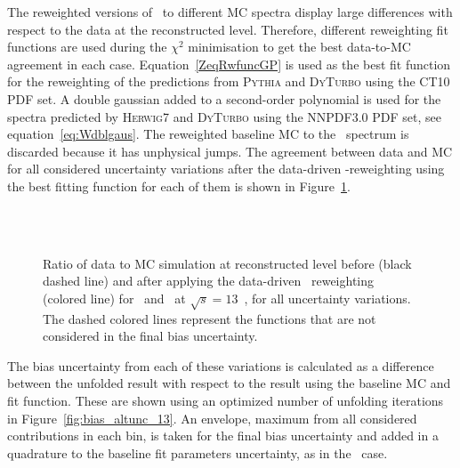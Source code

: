 The reweighted versions of \POWHEG\ to different MC spectra display large differences with respect to the data at the reconstructed level. Therefore, different reweighting fit functions are used during the $\chi^{2}$ minimisation to get the best data-to-MC agreement in each case.
Equation~\ref{ZeqRwfuncGP} is used as the best fit function for the reweighting of the predictions from \textsc{Pythia} and \textsc{DyTurbo} using the CT10 PDF set. A double gaussian added to a second-order polynomial is used for the spectra predicted by \textsc{Herwig7} and \textsc{DyTurbo} using the NNPDF3.0 PDF set, see equation~\ref{eq:Wdblgaus}.
The reweighted baseline MC to the \Sherpa\ spectrum is discarded because it has unphysical jumps.
The agreement between data and MC for all considered uncertainty variations after the data-driven \pt-reweighting using the best fitting function for each of them is shown in Figure~\ref{fig:fit_datamc_altunc_13_1GeV}.

\begin{figure}[h]
\centering
{}
\\
\\
\caption{Ratio of data to MC simulation at reconstructed level before (black dashed line) and after applying the data-driven \pt\ reweighting (colored line) for \ptll\ and \ut\ at $\sqrt{s} = 13$~\TeV, for all uncertainty variations. The dashed colored lines represent the functions that are not considered in the final bias uncertainty. }
\label{fig:fit_datamc_altunc_13_1GeV}
\end{figure}

The bias uncertainty from each of these variations is calculated as a difference between the unfolded result with respect to the result using the baseline MC and fit function.
These are shown using an optimized number of unfolding iterations in Figure~\ref{fig:bias_altunc_13}.
An envelope, maximum from all considered contributions in each bin, is taken for the final bias uncertainty and added in a quadrature to the baseline fit parameters uncertainty, as in the \Wboson\ case.

